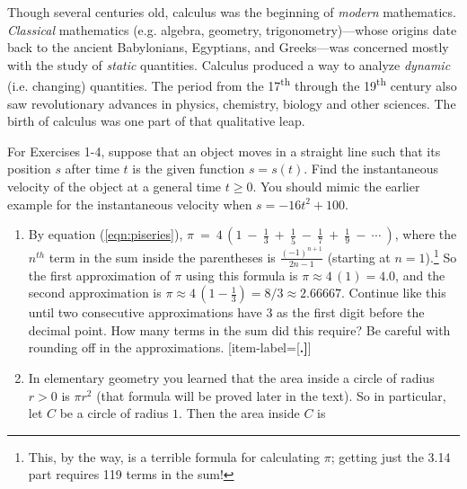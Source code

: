 Though several centuries old, calculus was the beginning of \emph{modern}
mathematics. \emph{Classical} mathematics (e.g. algebra, geometry,
trigonometry)---whose origins date back to the ancient Babylonians, Egyptians,
and Greeks---was concerned mostly with the study of \emph{static} quantities.
Calculus produced a way to analyze \emph{dynamic} (i.e. changing) quantities.
The period from the 17\textsuperscript{th} through the 19\textsuperscript{th}
century also saw revolutionary advances in physics, chemistry, biology and other
sciences. The birth of calculus was one part of that qualitative leap.
\newpage
\startexercises\label{sec1dot1}
{\small
{}
\par\noindent For Exercises 1-4, suppose that an object moves in a straight line
such that its position $s$ after time $t$ is the given function $s=s(t)$. Find
the instantaneous velocity of the object at a general time $t \ge 0$.
You should mimic the earlier example for the instantaneous velocity when
$s = -16t^2 + 100$.
\begin{enumerate}[item-label=\bfseries \arabic*.]
 \item By equation (\ref{eqn:piseries}), $\pi ~=~ 4\,\left(1 ~-~ \frac{1}{3} ~+~
  \frac{1}{5} ~-~ \frac{1}{7} ~+~ \frac{1}{9} ~-~ \cdots ~\right)$, where the
  $n^{th}$ term in the sum inside the parentheses is $\frac{(-1)^{n+1}}{2n-1}$
  (starting at $n=1$).\footnote{This, by the way, is a terrible formula
  for calculating $\pi$; getting just the 3.14 part requires 119 terms in the
  sum!} So the first approximation of $\pi$ using this formula is
  $\pi \approx 4\,(1) = 4.0$, and the second approximation is $\pi \approx
  4\,\left(1 - \frac{1}{3}\right) = 8/3 \approx 2.66667$. Continue like this
  until two consecutive approximations have $3$ as the first digit before the
  decimal point. How many terms in the sum did this require? Be careful with
  rounding off in the approximations.
[item-label={[\bfseries \arabic*.]}]
 \item In elementary geometry you learned that the area inside a circle of
  radius $r>0$ is $\pi r^2$ (that formula will be proved later in the text). So
  in particular, let $C$ be a circle of radius $1$. Then the area inside $C$ is

\end{enumerate}}
